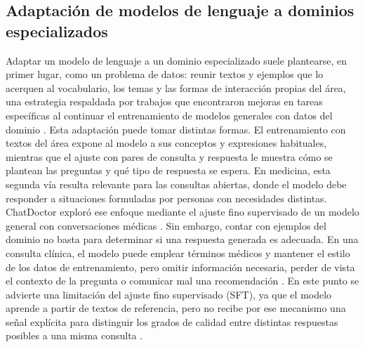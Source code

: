 \subsection{Adaptación de modelos de lenguaje a dominios especializados}
Adaptar un modelo de lenguaje a un dominio especializado suele plantearse, en primer lugar, como un problema de datos: reunir textos y ejemplos que lo acerquen al vocabulario, los temas y las formas de interacción propias del área, una estrategia respaldada por trabajos que encontraron mejoras en tareas específicas al continuar el entrenamiento de modelos generales con datos del dominio \cite{gururangan2020dontstop}. Esta adaptación puede tomar distintas formas. El entrenamiento con textos del área expone al modelo a sus conceptos y expresiones habituales, mientras que el ajuste con pares de consulta y respuesta le muestra cómo se plantean las preguntas y qué tipo de respuesta se espera. En medicina, esta segunda vía resulta relevante para las consultas abiertas, donde el modelo debe responder a situaciones formuladas por personas con necesidades distintas. ChatDoctor exploró ese enfoque mediante el ajuste fino supervisado de un modelo general con conversaciones médicas \cite{li2023chatdoctor}. Sin embargo, contar con ejemplos del dominio no basta para determinar si una respuesta generada es adecuada. En una consulta clínica, el modelo puede emplear términos médicos y mantener el estilo de los datos de entrenamiento, pero omitir información necesaria, perder de vista el contexto de la pregunta o comunicar mal una recomendación \cite{arora2025healthbench}. En este punto se advierte una limitación del ajuste fino supervisado (SFT), ya que el modelo aprende a partir de textos de referencia, pero no recibe por ese mecanismo una señal explícita para distinguir los grados de calidad entre distintas respuestas posibles a una misma consulta \cite{ouyang2022instructgpt}.

